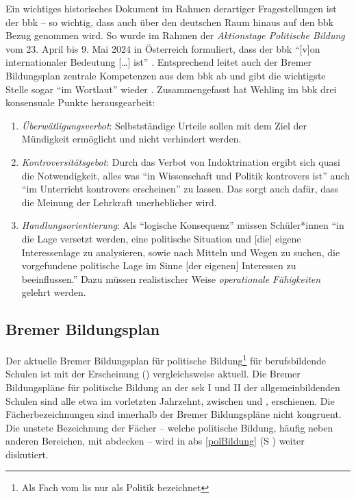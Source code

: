 Ein wichtiges historisches Dokument im Rahmen derartiger Fragestellungen ist der \Acrlong{bbk} \autocites[29]{Gesner2016}{Wehling1977} -- so wichtig, dass auch über den deutschen Raum hinaus auf den \gls{bbk} Bezug genommen wird. So wurde im Rahmen der \emph{Aktionstage Politische Bildung} vom 23. April bis 9. Mai 2024 in Österreich formuliert, dass der \gls{bbk} \enquote{[v]on internationaler Bedeutung [\dots] ist} \autocite{bbkÖsterreich2023}. Entsprechend leitet auch der Bremer Bildungsplan zentrale Kompetenzen aus dem \gls{bbk} ab und gibt die wichtigste Stelle sogar \enquote{im Wortlaut} wieder \autocite[11-12]{bplan}.
Zusammengefasst hat Wehling im \gls{bbk} drei konsensuale Punkte herausgearbeit:
\begin{enumerate}
    \item \emph{Überwätligungsverbot}: Selbstständige Urteile sollen mit dem Ziel der Mündigkeit ermöglicht und nicht verhindert werden. 
    \item \emph{Kontroversitätsgebot}: Durch das Verbot von Indoktrination ergibt sich quasi die Notwendigkeit, alles was \enquote{in Wissenschaft und Politik kontrovers ist} auch \enquote{im Unterricht kontrovers erscheinen} zu lassen. Das sorgt auch dafür, dass die Meinung der Lehrkraft unerheblicher wird.
    \item \emph{Handlungsorientierung}: Als \enquote{logische Konsequenz} müssen Schüler*innen \enquote{in die Lage versetzt werden, eine politische Situation und [die] eigene Interessenlage zu analysieren, sowie nach Mitteln und Wegen zu suchen, die vorgefundene politische Lage im Sinne [der eigenen] Interessen zu beeinflussen.} Dazu müssen realistischer Weise \emph{operationale Fähigkeiten} gelehrt werden. 
    
    \autocite[][179-180]{Wehling1977}
\end{enumerate}



\subsection{Bremer Bildungsplan \label{bplan}} %
Der aktuelle Bremer Bildungsplan für politische Bildung\footnote{Als Fach vom \gls{lis} nur als Politik bezeichnet} für berufsbildende Schulen ist mit der Erscheinung \citeyear{bplan} (\citeauthor{bplan}) vergleichsweise aktuell. Die Bremer Bildungspläne für politische Bildung an der \gls{sek} I und II der allgemeinbildenden Schulen sind alle etwa im vorletzten Jahrzehnt, zwischen \citeyear{vogel2006gy} \autocites{vogel2006gs, vogel2006gy, lower2008} und \citeyear{vogel2010gp} \autocite{vogel2010gp}, erschienen. Die Fächerbezeichnungen sind innerhalb der Bremer Bildungspläne nicht kongruent. Die unstete Bezeichnung der Fächer -- welche politische Bildung, häufig neben anderen Bereichen, mit abdecken -- wird in \gls{abs} \ref{polBildung} (\gls{S} \pageref{polBildung}) weiter diskutiert.

